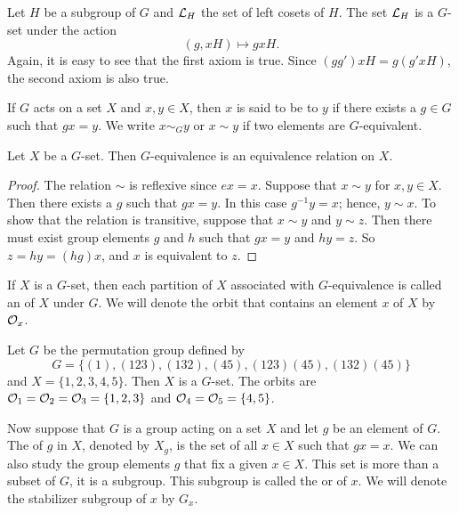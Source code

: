 
\medskip
 
 
\begin{example}
Let $H$ be a subgroup of $G$ and ${\cal L}_H$ the set of left cosets
of $H$.  The set ${\cal L}_H$ is a $G$-set under the action
$$
(g, xH) \mapsto gxH.
$$
Again, it is easy to see that the first axiom is true. Since $(g g')xH
= g( g'x H)$, the second axiom is  also true.
\end{example}
 
 
\medskip
 
 
If $G$ acts on a set $X$ and $x, y \in X$, then $x$ is said to be
 to $y$ if there exists a
$g \in G$ such that $gx =y$. We  write $x \sim_G y$ or $x \sim y$ if
two elements are $G$-equivalent. 
 
 
\begin{proposition}
Let  $X$ be a $G$-set. Then $G$-equivalence is an equivalence relation
on $X$. 
\end{proposition}
 
 
\begin{proof}
The relation $\sim$ is reflexive since $ex = x$. Suppose that $x \sim
y$ for $x, y \in X$. Then there exists a $g$ such that $gx = y$. In
this case $g^{-1}y=x$; hence, $y \sim x$. To show that the relation is
transitive, suppose that $x \sim y$ and $y \sim z$. Then there must
exist group elements $g$ and $h$ such that $gx = y$ and $hy= z$. So $z
= hy = (hg)x$, and  $x$ is equivalent to $z$.
\end{proof}
 
 
\medskip
 
 
If $X$ is a $G$-set, then each partition of $X$ associated with
$G$-equivalence is called an  of $X$ under
$G$.  We will denote the orbit that contains an element $x$  of $X$ by
${\cal O}_x$\label{noteorbit}. 
 
 
\medskip
 
 
\begin{example}
Let $G$ be the permutation group defined by
$$
G =\{(1), (1 2
3), (1 3 2), (4 5), (1 2 3)(4 5), (1 3 2)(4 5) \}
$$
and $X = \{ 1, 2, 3, 4, 5\}$. Then $X$ is a $G$-set. The orbits are
${\cal O}_1 = {\cal O}_2 = {\cal O}_3 =\{1, 2, 3\}$ and $ {\cal O}_4=
{\cal O}_5 = \{4, 5\}$. 
\end{example}
 
 
\medskip
 
 
Now suppose that $G$ is a group acting on a set $X$ and let $g$ be
an element of $G$. The  of $g$ in $X$, denoted by $X_g$\label{notefixed}, is the set of 
all $x \in X$ such
that $gx = x$.  We can also study the group elements $g$ that fix a
given $x \in X$. This set is more than a subset of  $G$, it is a
subgroup.  This subgroup is called the  or  of $x$. We will denote the 
stabilizer subgroup of $x$ by $G_x$\label{noteisotropy}. 
 
